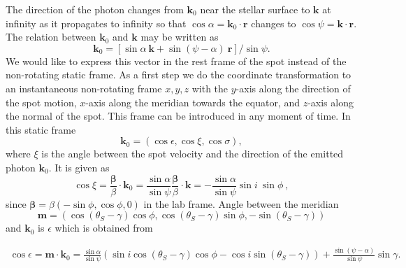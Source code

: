 \documentclass{wihuri}
\def\be{\begin{equation}}
\def\ee{\end{equation}}
\def\thetas{\theta_{S}}
\newcommand{\bmath}[1]{\boldsymbol{#1}}
\begin{document}
The direction of the photon changes from $\bmath{k}_0$ near the stellar surface to $\bmath{k}$ at infinity as it propagates to infinity so that $\cos\alpha=\bmath{k}_0\cdot\bmath{r}$
changes to $\cos\psi=\bmath{k}\cdot\bmath{r}$.
The relation between $\bmath{k}_0$ and $\bmath{k}$ may be written as
\be\label{eq:k02}
\bmath{k}_0=[ \sin\alpha\ \bmath{k} +\sin(\psi-\alpha)\ \bmath{r}]/\sin\psi.
\ee
We would like to express this vector in the rest frame of the spot instead of the non-rotating static frame. As a first step we do the coordinate transformation to an instantaneous non-rotating frame $x,y,z$ with the $y$-axis along the direction of the spot motion, $x$-axis along the meridian towards the equator, and $z$-axis along the normal of the spot. This frame can be introduced in any moment of time. In this static frame
\be 
\bmath{k}_0=
\left( 
\cos \epsilon,
\cos\xi, 
\cos\sigma
\right) ,
\ee 
where $\xi$ is the angle  between the spot velocity and the direction of the emitted photon $\bmath{k}_0$. It is given as   
\be \label{eq:cosxi22}
\cos\xi=\frac{\bmath{\beta}}{\beta} \cdot \bmath{k}_0
=\frac{\sin\alpha}{\sin\psi} \frac{\bmath{\beta}}{\beta} \cdot \bmath{k}=
- \frac{\sin\alpha}{\sin\psi}\sin i\ \sin\phi\ ,
\ee
since $\bmath{\beta} = \beta(-\sin\phi,\cos\phi,0)$ in the lab frame. Angle between the meridian %
\be
 \bmath{m} = (\cos(\thetas - \gamma)\cos \phi ,\cos (\thetas -\gamma)\sin \phi, -\sin (\thetas -\gamma))
\ee
and $\bmath{k}_0$ is $\epsilon$ which is obtained from 

\be \label{eq:kx-comp}
\begin{split}
\cos\epsilon= \bmath{m} \cdot \bmath{k}_0
=\frac{\sin\alpha}{\sin\psi} (\sin i \cos(\thetas -\gamma)\cos \phi -\cos i \sin (\thetas -\gamma))
+ \frac{\sin (\psi - \alpha)}{\sin \psi}\sin\gamma.
\end{split}
\ee
\end{document}
